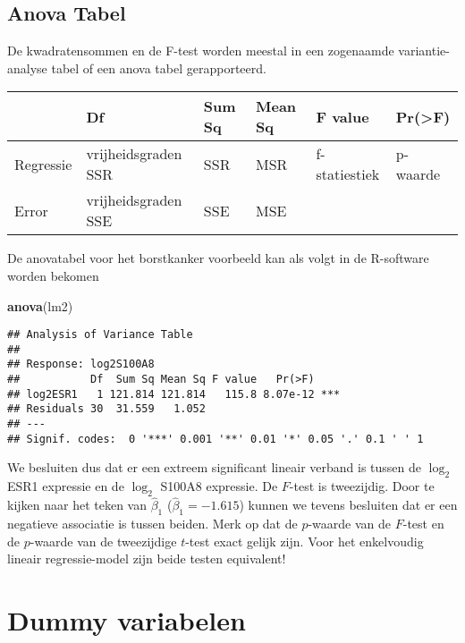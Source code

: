 \documentclass[
  12pt,dutch,coursenotes]{book}
\newenvironment{Shaded}{\begin{snugshade}}{\end{snugshade}}
\newcommand{\KeywordTok}[1]{\textcolor[rgb]{0.13,0.29,0.53}{\textbf{#1}}}
\newcommand{\NormalTok}[1]{#1}
\theoremstyle{definition}
\theoremstyle{definition}
\theoremstyle{definition}
\theoremstyle{remark}
\begin{document}
\hypertarget{anova-tabel}{%
\subsection{Anova Tabel}\label{anova-tabel}}

De kwadratensommen en de F-test worden meestal in een zogenaamde variantie-analyse tabel of een anova tabel gerapporteerd.

\begin{tabular}{l|l|l|l|l|l}
\hline
  & Df & Sum Sq & Mean Sq & F value & Pr(>F)\\
\hline
Regressie & vrijheidsgraden SSR & SSR & MSR & f-statiestiek & p-waarde\\
\hline
Error & vrijheidsgraden SSE & SSE & MSE &  & \\
\hline
\end{tabular}

De anovatabel voor het borstkanker voorbeeld kan als volgt in de R-software worden bekomen

\begin{Shaded}
\begin{Highlighting}[]
\KeywordTok{anova}\NormalTok{(lm2)}
\end{Highlighting}
\end{Shaded}

\begin{verbatim}
## Analysis of Variance Table
## 
## Response: log2S100A8
##           Df  Sum Sq Mean Sq F value   Pr(>F)    
## log2ESR1   1 121.814 121.814   115.8 8.07e-12 ***
## Residuals 30  31.559   1.052                     
## ---
## Signif. codes:  0 '***' 0.001 '**' 0.01 '*' 0.05 '.' 0.1 ' ' 1
\end{verbatim}

We besluiten dus dat er een extreem significant lineair verband is tussen de \(\log_2\) ESR1 expressie en de \(\log_2\) S100A8 expressie. De \(F\)-test is tweezijdig. Door te kijken naar het teken van \(\hat\beta_1\) (\(\hat\beta_1=-1.615\)) kunnen we tevens besluiten dat er een negatieve associatie is tussen beiden.
Merk op dat de \(p\)-waarde van de \(F\)-test en de \(p\)-waarde van de tweezijdige \(t\)-test exact gelijk zijn. Voor het enkelvoudig lineair regressie-model zijn beide testen equivalent!

\hypertarget{sec:linDummy}{%
\section{Dummy variabelen}\label{sec:linDummy}}
\end{document}
